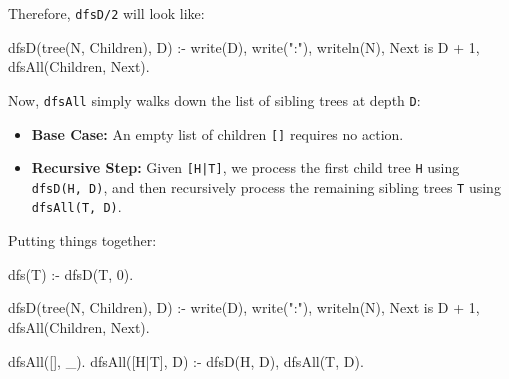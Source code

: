 

Therefore, \texttt{dfsD/2} will look like:
\begin{codeblock}
dfsD(tree(N, Children), D) :-
    write(D), write(":"), writeln(N),
    Next is D + 1,
    dfsAll(Children, Next).
\end{codeblock}

Now, \texttt{dfsAll} simply walks down the list of sibling trees at depth \texttt{D}:
\begin{itemize}
    \item \textbf{Base Case:} An empty list of children \texttt{[]} requires no action.
    \item \textbf{Recursive Step:} Given \texttt{[H|T]}, we process the first child tree \texttt{H} using \texttt{dfsD(H, D)}, and then recursively process the remaining sibling trees \texttt{T} using \texttt{dfsAll(T, D)}.
\end{itemize}


Putting things together:
\begin{codeblock}
dfs(T) :- 
    dfsD(T, 0).

dfsD(tree(N, Children), D) :-
    write(D), write(":"), writeln(N),
    Next is D + 1,
    dfsAll(Children, Next).

dfsAll([], _).
dfsAll([H|T], D) :-
    dfsD(H, D),
    dfsAll(T, D).
\end{codeblock}

